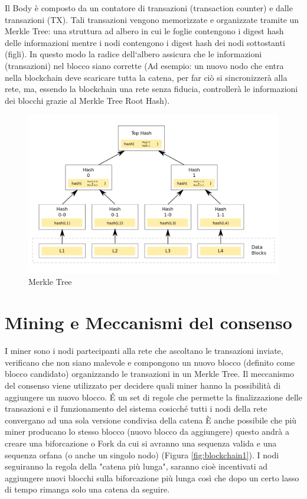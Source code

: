 \documentclass[11pt,a4paper,titlepage]{report}
\begin{document}
Il Body è composto da un contatore di transazioni (transaction counter) e dalle transazioni (TX). Tali transazioni vengono memorizzate e organizzate tramite un Merkle Tree: una struttura ad albero in cui le foglie contengono i digest hash delle informazioni mentre i nodi contengono i digest hash dei nodi sottostanti (figli). In  questo modo la radice dell`albero assicura che le informazioni (transazioni) nel blocco siano corrette (Ad esempio: un nuovo nodo che entra nella blockchain deve scaricare tutta la catena, per far ciò si sincronizzerà alla rete, ma, essendo la blockchain una rete senza fiducia, controllerà le informazioni dei blocchi grazie al Merkle Tree Root Hash).
\begin{figure}[h]
	\includegraphics[width=\textwidth]{Hash_Tree}
	\centering
	\caption{Merkle Tree}
	\label{fig:Tree1}
\end{figure}

\section{Mining e Meccanismi del consenso}
I miner sono i nodi partecipanti alla rete che  ascoltano le transazioni inviate, verificano che non siano malevole e compongono un nuovo blocco (definito come blocco candidato) organizzando le transazioni in un Merkle Tree.
Il meccanismo del consenso viene utilizzato  per decidere quali miner hanno la possibilità di aggiungere un nuovo blocco.
É un set di regole che permette la finalizzazione delle transazioni e il funzionamento del sistema cosicché tutti i nodi della rete convergano ad una sola versione condivisa della catena
È anche possibile che più miner producano lo stesso blocco (nuovo blocco da aggiungere) questo andrà a creare una biforcazione o Fork da cui si avranno una sequenza valida e una sequenza orfana (o anche un singolo nodo) (Figura \ref{fig:blockchain1}). I nodi seguiranno la regola della "catena più lunga", saranno cioè incentivati ad aggiungere nuovi blocchi sulla biforcazione più lunga così che dopo un certo lasso di tempo rimanga solo una catena da seguire. 
\end{document}
